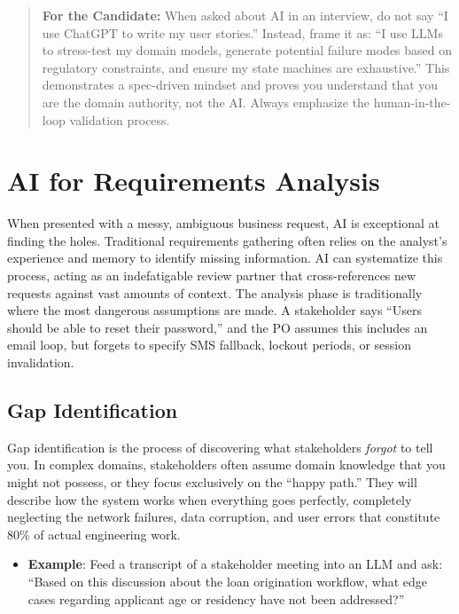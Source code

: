 \begin{quote}
\textbf{For the Candidate:} When asked about AI in an interview, do not
say ``I use ChatGPT to write my user stories.'' Instead, frame it as:
``I use LLMs to stress-test my domain models, generate potential failure
modes based on regulatory constraints, and ensure my state machines are
exhaustive.'' This demonstrates a spec-driven mindset and proves you
understand that you are the domain authority, not the AI. Always
emphasize the human-in-the-loop validation process.
\end{quote}

\section{AI for Requirements
Analysis}\label{ai-for-requirements-analysis}

When presented with a messy, ambiguous business request, AI is
exceptional at finding the holes. Traditional requirements gathering
often relies on the analyst's experience and memory to identify missing
information. AI can systematize this process, acting as an indefatigable
review partner that cross-references new requests against vast amounts
of context. The analysis phase is traditionally where the most dangerous
assumptions are made. A stakeholder says ``Users should be able to reset
their password,'' and the PO assumes this includes an email loop, but
forgets to specify SMS fallback, lockout periods, or session
invalidation.

\subsection{Gap Identification}\label{gap-identification}

Gap identification is the process of discovering what stakeholders
\emph{forgot} to tell you. In complex domains, stakeholders often assume
domain knowledge that you might not possess, or they focus exclusively
on the ``happy path.'' They will describe how the system works when
everything goes perfectly, completely neglecting the network failures,
data corruption, and user errors that constitute 80\% of actual
engineering work.

\begin{itemize}
\tightlist
\item
  \textbf{Example}: Feed a transcript of a stakeholder meeting into an
  LLM and ask: ``Based on this discussion about the loan origination
  workflow, what edge cases regarding applicant age or residency have
  not been addressed?''
\end{itemize}

